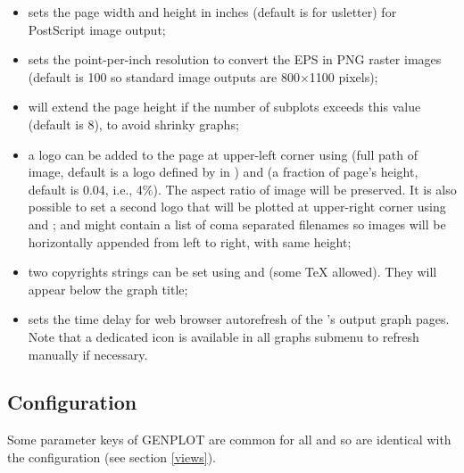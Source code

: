 \begin{itemize}
	

	\item {} sets the page width and height in inches (default is  for usletter) for PostScript image output;
	\item {} sets the point-per-inch resolution to convert the EPS in PNG raster images (default is 100 so standard image outputs are 800$\times$1100 pixels); 
	\item {} will extend the page height if the number of subplots exceeds this value (default is 8), to avoid shrinky graphs; 
	\item a logo can be added to the page at upper-left corner using  (full path of image, default is a \webobs logo defined by  in ) and  (a fraction of page's height, default is 0.04, i.e., 4\%). The aspect ratio of image will be preserved. It is also possible to set a second logo that will be plotted at upper-right corner using  and ;  and  might contain a list of coma separated filenames so images will be horizontally appended from left to right, with same height;
	\item two copyrights strings can be set using  and  (some TeX allowed). They will appear below the graph title;
	\item {} sets the time delay for web browser autorefresh of the 's output graph pages. Note that a dedicated icon is available in all graphs submenu to refresh manually if necessary.
\end{itemize}

\subsection{Configuration}

Some parameter keys of GENPLOT are common for all  and  so are identical with the  configuration (see section \ref{views}).




\newpage
